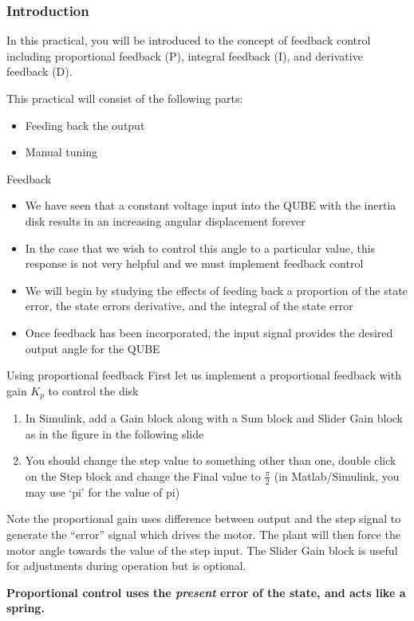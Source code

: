\documentclass[9pt]{beamer-control}
\begin{document}

\begin{frame}
\frametitle{Introduction}
In this practical, you will be introduced to the concept of feedback control including proportional feedback (P), integral feedback (I), and derivative feedback (D).

\vfill

This practical will consist of the following parts:
\begin{itemize}
\item Feeding back the output
\item Manual tuning
\end{itemize}
\end{frame}



\begin{frame}{Feedback}
\begin{itemize}
\item We have seen that a constant voltage input into the QUBE with the inertia disk results in an increasing angular displacement forever
\item In the case that we wish to control this angle to a particular value, this response is not very helpful and we must implement feedback control
\item We will begin by studying the effects of feeding back a proportion of the state error, the state errors derivative, and the integral of the state error
\item Once feedback has been incorporated, the input signal provides the desired output angle for the QUBE
\end{itemize}
\end{frame}

\begin{frame}{Using proportional feedback}
First let us implement a proportional feedback with gain $K_p$ to control the disk
\begin{enumerate}
	\item In Simulink, add a Gain block along with a Sum block and Slider Gain block as in the figure in the following slide
	\item You should change the step value to something other than one, double click on the Step block and change the Final value to $\tfrac{\pi}{2}$ (in Matlab/Simulink, you may use ‘pi’ for the value of pi)
\end{enumerate}
Note the proportional gain uses difference between output and the step signal to generate the “error” signal which drives the motor. The plant will then force the motor angle towards the value of the step input. The Slider Gain block is useful for adjustments during operation but is optional.
	
\textbf{Proportional control uses the \textit{present} error of the state, and acts like a spring.}
	
\end{frame}
\end{document}
